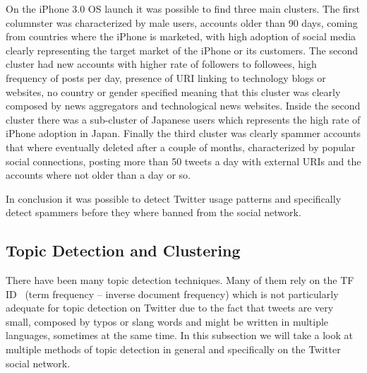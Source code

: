 On the iPhone 3.0 OS launch it was possible to find three main clusters. The first columnster was characterized by male users, accounts older than 90 days, coming from countries where the iPhone is marketed, with high adoption of social media clearly representing the target market of the iPhone or its customers. The second cluster had new accounts with higher rate of followers to followees, high frequency of posts per day, presence of URI linking to technology blogs or websites, no country or gender specified meaning that this cluster was clearly composed by news aggregators and technological news websites. Inside the second cluster there was a sub-cluster of Japanese users which represents the high rate of iPhone adoption in Japan. Finally the third cluster was clearly spammer accounts that where eventually deleted after a couple of months, characterized by popular social connections, posting more than 50 tweets a day with external URIs and the accounts where not older than a day or so.

In conclusion it was possible to detect Twitter usage patterns and specifically detect spammers before they where banned from the social network. 

\subsection{Topic Detection and Clustering} 
\label{sub:topic_detection_on_twitter}
There have been many topic detection techniques. Many of them rely on the TF ID~\cite{Baeza-Yates:1999:MIR:553876} (term frequency – inverse document frequency) which is not particularly adequate for topic detection on Twitter due to the fact that tweets are very small, composed by typos or slang words and might be written in multiple languages, sometimes at the same time. In this subsection we will take a look at multiple methods of topic detection in general and specifically on the Twitter social network.

